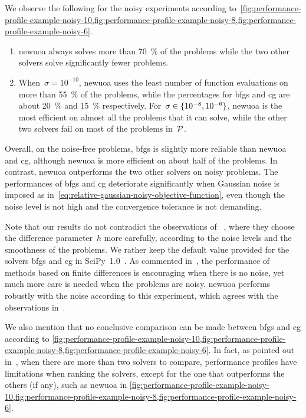 We observe the following for the noisy experiments according to~\cref{fig:performance-profile-example-noisy-10,fig:performance-profile-example-noisy-8,fig:performance-profile-example-noisy-6}.
\begin{enumerate}
    \item \Gls{newuoa} always solves more than \SI{70}{\percent} of the problems while the two other solvers solve significantly fewer problems.
    \item When~$\sigma = 10^{-10}$, \gls{newuoa} uses the least number of function evaluations on more than \SI{55}{\percent} of the problems, while the percentages for \gls{bfgs} and \gls{cg} are about \SI{20}{\percent} and \SI{15}{\percent} respectively.
    For~$\sigma \in \{10^{-8}, 10^{-6}\}$, \gls{newuoa} is the most efficient on almost all the problems that it can solve, while the other two solvers fail on most of the problems in~$\mathcal{P}$.
\end{enumerate}

Overall, on the noise-free problems, \gls{bfgs} is slightly more reliable than \gls{newuoa} and \gls{cg}, although \gls{newuoa} is more efficient on about half of the problems.
In contrast, \gls{newuoa} outperforms the two other solvers on noisy problems.
The performances of \gls{bfgs} and \gls{cg} deteriorate significantly when Gaussian noise is imposed as in~\cref{eq:relative-gaussian-noisy-objective-function}, even though the noise level is not high and the convergence tolerance is not demanding.

Note that our results do not contradict the observations of \citeauthor{Shi_Etal_2021}~\cite{Shi_Etal_2021}, where they choose the difference parameter~$h$ more carefully, according to the noise levels and the smoothness of the problems.
We rather keep the default value provided for the solvers \gls{bfgs} and \gls{cg} in SciPy~1.0~\cite{Virtanen_Etal_2020}.
As commented in~\cite{Shi_Etal_2021}, the performance of methods based on finite differences is encouraging when there is no noise, yet much more care is needed when the problems are noisy.
\Gls{newuoa} performs robustly with the noise according to this experiment, which agrees with the observations in~\cite{Shi_Etal_2021}.

We also mention that no conclusive comparison can be made between \gls{bfgs} and \gls{cg} according to \cref{fig:performance-profile-example-noisy-10,fig:performance-profile-example-noisy-8,fig:performance-profile-example-noisy-6}.
In fact, as pointed out in~\cite{Gould_Scott_2016}, when there are more than two solvers to compare, performance profiles have limitations when ranking the solvers, except for the one that outperforms the others (if any), such as \gls{newuoa} in \cref{fig:performance-profile-example-noisy-10,fig:performance-profile-example-noisy-8,fig:performance-profile-example-noisy-6}.

